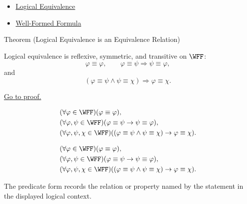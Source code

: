 \begin{dependencies}
\begin{itemize}
  \item \hyperref[def:logical-equivalence-propositional-logic]{Logical Equivalence}
  \item \hyperref[def:well-formed-formula]{Well-Formed Formula}
\end{itemize}
\end{dependencies}
\begin{theorembox}{Theorem (Logical Equivalence is an Equivalence Relation)}
\begin{theorem}
\label{thm:logical-equivalence-equivalence-relation}
Logical equivalence is reflexive, symmetric, and transitive on \(\WFF\):
\[
\varphi\equiv\varphi,
\qquad
\varphi\equiv\psi\Longrightarrow\psi\equiv\varphi,
\]
and
\[
(\varphi\equiv\psi\land\psi\equiv\chi)
\Longrightarrow
\varphi\equiv\chi.
\]

\noindent\hyperref[prf:logical-equivalence-equivalence-relation]{Go to proof.}
\end{theorem}
\end{theorembox}
\begin{remark*}
\[
\begin{aligned}
&(\forall\varphi\in\WFF)(\varphi\equiv\varphi),\\
&(\forall\varphi,\psi\in\WFF)(\varphi\equiv\psi\to\psi\equiv\varphi),\\
&(\forall\varphi,\psi,\chi\in\WFF)
((\varphi\equiv\psi\land\psi\equiv\chi)\to\varphi\equiv\chi).
\end{aligned}
\]
\end{remark*}

\begin{remark*}
\[
\begin{aligned}
&(\forall\varphi\in\WFF)(\varphi\equiv\varphi),\\
&(\forall\varphi,\psi\in\WFF)(\varphi\equiv\psi\to\psi\equiv\varphi),\\
&(\forall\varphi,\psi,\chi\in\WFF)
((\varphi\equiv\psi\land\psi\equiv\chi)\to\varphi\equiv\chi).
\end{aligned}
\]

The predicate form records the relation or property named by the statement in
the displayed logical context.
\end{remark*}


